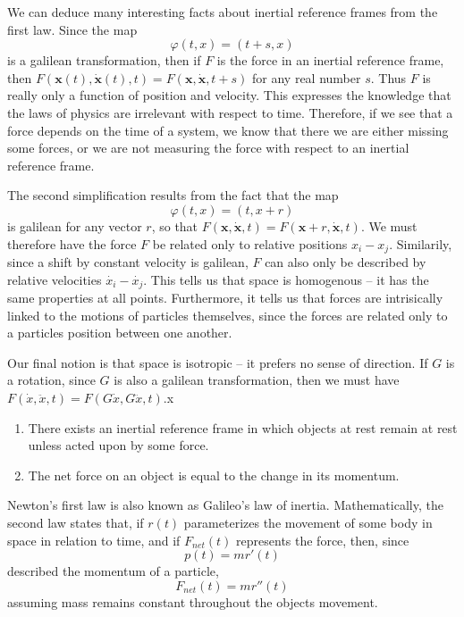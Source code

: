 We can deduce many interesting facts about inertial reference frames from the first law. Since the map
%
\[ \varphi(t,x) = (t + s,x) \]
%
is a galilean transformation, then if $F$ is the force in an inertial reference frame, then $F(\mathbf{x}(t), \dot{\mathbf{x}}(t), t) = F(\mathbf{x}, \dot{\mathbf{x}}, t + s)$ for any real number $s$. Thus $F$ is really only a function of position and velocity. This expresses the knowledge that the laws of physics are irrelevant with respect to time. Therefore, if we see that a force depends on the time of a system, we know that there we are either missing some forces, or we are not measuring the force with respect to an inertial reference frame.

The second simplification results from the fact that the map
%
\[ \varphi(t,x) = (t,x + r) \]
%
is galilean for any vector $r$, so that $F(\mathbf{x}, \dot{\mathbf{x}}, t) = F(\mathbf{x} + r, \dot{\mathbf{x}}, t)$. We must therefore have the force $F$ be related only to relative positions $x_i - x_j$. Similarily, since a shift by constant velocity is galilean, $F$ can also only be described by relative velocities $\dot{x_i} - \dot{x_j}$. This tells us that space is homogenous -- it has the same properties at all points. Furthermore, it tells us that forces are intrisically linked to the motions of particles themselves, since the forces are related only to a particles position between one another.

Our final notion is that space is isotropic -- it prefers no sense of direction. If $G$ is a rotation, since $G$ is also a galilean transformation, then we must have $F(\dot{x}, \ddot{x}, t) = F(G\dot{x}, G\ddot{x}, t)$.x



\begin{enumerate}
    \item There exists an inertial reference frame in which objects at rest remain at rest unless acted upon by some force.
    \item The net force on an object is equal to the change in its momentum.
\end{enumerate}

Newton's first law is also known as Galileo's law of inertia. Mathematically, the second law states that, if $r(t)$ parameterizes the movement of some body in space in relation to time, and if $F_{net}(t)$ represents the force, then, since
%
\[ p(t) = mr'(t) \]
%
described the momentum of a particle,
%
\[ F_{net}(t) = mr''(t) \]
%
assuming mass remains constant throughout the objects movement.

